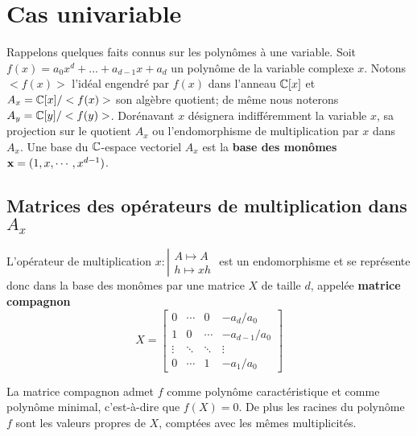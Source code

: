 \documentclass{standalone}
\begin{document}
\section{Cas univariable}
\label{univariable}

Rappelons quelques faits connus sur les polynômes à une variable.
Soit $f(x) = a_0x^d + \dots + a_{d-1}x + a_d$ un polynôme de la variable complexe $x$. Notons $<f(x)>$ l'idéal engendré par $f(x)$ dans l'anneau $\mathbb{C}[x]$ et $A_x = \mathbb{C}[x]/<f(x)>$  son algèbre quotient; de même nous noterons $A_y = \mathbb{C}[y]/<f(y)>$. Dorénavant $x$ désignera indifféremment la variable $x$, sa projection sur le quotient $A_x$ ou l'endomorphisme de multiplication par $x$ dans $A_x$. Une base du $\mathbb{C}$-espace vectoriel $A_x$ est la {\bf base des monômes} $\bold{x} = (1, x,\cdots, x^{d-1})$.

\subsection{Matrices des opérateurs de multiplication dans $A_x$}
L'opérateur de multiplication
$x : \left\vert
\begin{array}{c}
A \mapsto A \\
h \mapsto xh
\end{array}
\right.$
est un endomorphisme et se représente donc dans la base des monômes par une matrice $X$ de taille $d$, appelée {\bf matrice compagnon}
\begin{equation}
\label{compan}
X =
\begin{bmatrix}
	0 & \cdots & 0 & -a_d/a_0 \\
	1 & 0 & \cdots & -a_{d-1}/a_0 \\
	\vdots  & \ddots  & \ddots & \vdots  \\
	0 & \cdots & 1 & -a_1/a_0
\end{bmatrix}
\end{equation}

\begin{prop}
\label{compan2roots}
La matrice compagnon admet $f$ comme polynôme caractéristique et comme polynôme minimal, c'est-à-dire que $f(X) = 0$. De plus les racines du polynôme $f$ sont les valeurs propres de $X$, comptées avec les mêmes multiplicités.
\end{prop}
\end{document}
